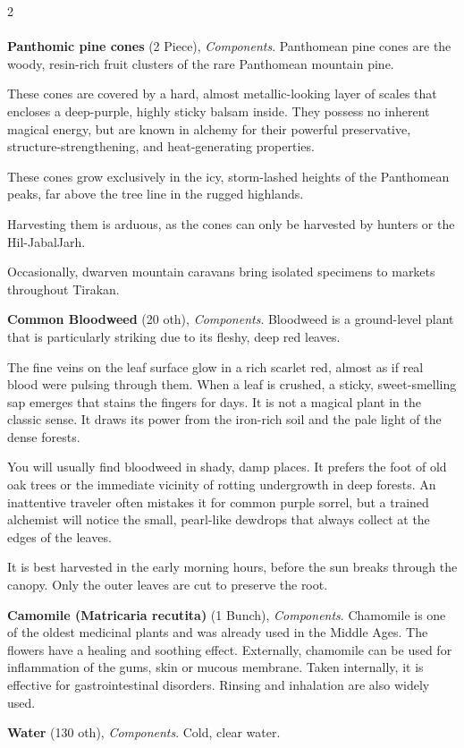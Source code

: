 \begin{multicols}{2}
    \paragraph{}
    \begin{denseitemize}
        \item \textbf{Panthomic pine cones} (2 Piece), \textit{Components}.
        Panthomean pine cones are the woody, resin-rich fruit clusters of the rare Panthomean mountain pine.

These cones are covered by a hard, almost metallic-looking layer of scales that encloses a deep-purple, highly sticky balsam inside. They possess no inherent magical energy, but are known in alchemy for their powerful preservative, structure-strengthening, and heat-generating properties.

These cones grow exclusively in the icy, storm-lashed heights of the Panthomean peaks, far above the tree line in the rugged highlands.

Harvesting them is arduous, as the cones can only be harvested by hunters or the Hil-JabalJarh.

Occasionally, dwarven mountain caravans bring isolated specimens to markets throughout Tirakan.
        \item \textbf{Common Bloodweed} (20 oth), \textit{Components}.
        Bloodweed is a ground-level plant that is particularly striking due to its fleshy, deep red leaves.

The fine veins on the leaf surface glow in a rich scarlet red, almost as if real blood were pulsing through them. When a leaf is crushed, a sticky, sweet-smelling sap emerges that stains the fingers for days. It is not a magical plant in the classic sense. It draws its power from the iron-rich soil and the pale light of the dense forests.

You will usually find bloodweed in shady, damp places. It prefers the foot of old oak trees or the immediate vicinity of rotting undergrowth in deep forests. An inattentive traveler often mistakes it for common purple sorrel, but a trained alchemist will notice the small, pearl-like dewdrops that always collect at the edges of the leaves.

It is best harvested in the early morning hours, before the sun breaks through the canopy. Only the outer leaves are cut to preserve the root.
        \item \textbf{Camomile (Matricaria recutita)} (1 Bunch), \textit{Components}.
        Chamomile is one of the oldest medicinal plants and was already used in the Middle Ages. The flowers have a healing and soothing effect. Externally, chamomile can be used for inflammation of the gums, skin or mucous membrane. Taken internally, it is effective for gastrointestinal disorders. Rinsing and inhalation are also widely used.
        \item \textbf{Water} (130 oth), \textit{Components}.
        Cold, clear water.
    \end{denseitemize}



\end{multicols}
